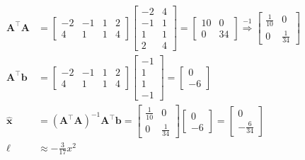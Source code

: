 \documentclass[]{article}
\newcommand{\unit}[1]{\bm{\hat{#1}}}
\newcommand{\tpose}[1]{#1^{\! \top} \!}
\begin{document}
\begin{align}
	\tpose{\bm{A}} \bm{A} &=
	\begin{bmatrix}
	-2 & -1 & 1 & 2 \\
	4 & 1 & 1 & 4
	\end{bmatrix}
	\begin{bmatrix}
	-2 & 4 \\
	-1 & 1 \\
	1 & 1 \\
	2 & 4
	\end{bmatrix}
	=
	\begin{bmatrix}
	10 & 0 \\
	0 & 34
	\end{bmatrix}
	\overset{-1}{\Rightarrow}
	\begin{bmatrix}
	\frac{1}{10} & 0 \\
	0 & \frac{1}{34}
	\end{bmatrix} \\
	\tpose{\bm{A}} \bm{b} &=
	\begin{bmatrix}
	-2 & -1 & 1 & 2 \\
	4 & 1 & 1 & 4
	\end{bmatrix}
	\begin{bmatrix}
	-1 \\
	1 \\
	1 \\
	-1
	\end{bmatrix}
	=
	\begin{bmatrix}
	0 \\
	-6
	\end{bmatrix} \\
	\unit{x} &= (\tpose{\bm{A}} \bm{A})^{-1} \tpose{\bm{A}} \bm{b} =
	\begin{bmatrix}
	\frac{1}{10} & 0 \\
	0 & \frac{1}{34}
	\end{bmatrix}
	\begin{bmatrix}
	0 \\
	-6
	\end{bmatrix}
	=
	\begin{bmatrix}
	0 \\
	-\frac{6}{34}
	\end{bmatrix} \\
	\ell &\approx -\frac{3}{17} x^2
\end{align}

\subsection{}
\end{document}
